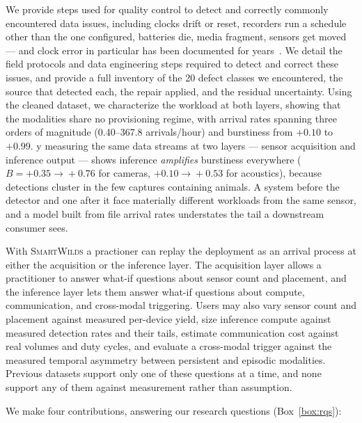 \documentclass[sigconf]{acmart}
\newcommand{\smartwilds}{\textsc{SmartWilds}\xspace}
\begin{document}
We provide steps used for quality control to detect and correctly commonly encountered data issues, including  clocks drift or reset, recorders run a
schedule other than the one configured, batteries die, media fragment,
sensors get moved --- and clock error in particular has been documented
for years~\cite{lahozmonfort2021monitoring,ahumada2020wildlifeinsights}. 
We detail the field protocols and data engineering steps required to detect and correct these issues, and provide a full inventory of the 20 defect classes we encountered, the source that detected each, the repair applied, and the residual uncertainty.
%
Using the cleaned dataset, we characterize the workload at both layers, showing that the modalities share no provisioning regime, with arrival rates spanning three orders of magnitude (0.40--367.8 arrivals/hour) and burstiness from $+0.10$ to $+0.99$.
y measuring the same data streams at two layers --- sensor
acquisition and inference output --- shows inference \emph{amplifies}
burstiness everywhere ($B{=}+0.35\!\to\!+0.76$ for cameras,
$+0.10\!\to\!+0.53$ for acoustics), because detections cluster in the
few captures containing animals. A system before the detector and one
after it face materially different workloads from the same sensor, and a
model built from file arrival rates understates the tail a downstream
consumer sees.


With \smartwilds a practioner can replay the deployment as an arrival
process at either the acquisition or the inference layer.
The acquisition layer allows a practitioner to answer what-if questions about sensor count and placement, and the inference layer lets them answer what-if questions about compute, communication, and cross-modal triggering.
Users may also vary sensor count and placement against measured per-device yield, size inference
compute against measured detection rates and their tails, estimate
communication cost against real volumes and duty cycles, and evaluate a
cross-modal trigger against the measured temporal asymmetry between
persistent and episodic modalities. 
Previous datasets support only one of these questions at a time, and none support any of them against measurement rather than assumption.


We make four contributions, answering our research questions (Box~\ref{box:rqs}):
\end{document}
